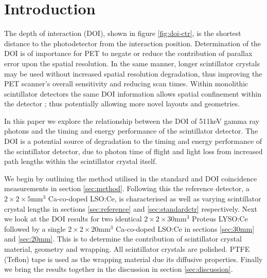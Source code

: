 \section{Introduction} 
The depth of interaction (DOI), shown in figure \ref{fig:doi-ctr}, is the shortest distance to the photodetector from the interaction position. Determination of the DOI is of importance for PET to negate or reduce the contribution of parallax error upon the spatial resolution\cite{Moses_2001}\cite{Humm_Rosenfeld_Del_Guerra_2003}. In the same manner, longer scintillator crystals may be used without increased spatial resolution degradation, thus improving the PET scanner's overall sensitivity and reducing scan times. Within monolithic scintillator detectors the same DOI information allows spatial confinement within the detector \cite{am_Borghi_Seifert_Schaart_2013}\cite{Maas_Bruyndonckx_Schaart_2012}; thus potentially allowing more novel\cite{Dendooven_Lohner_Beekman_2009}\cite{n_der_Lei_van_Dam_Schaart_2013} layouts and geometries.

In this paper we explore the relationship between the DOI of 511keV gamma ray photons and the timing and energy performance of the scintillator detector. The DOI is a potential source of degradation to the timing and energy performance of the scintillator detector, due to photon time of flight and light loss from increased path lengths within the scintillator crystal itself.

We begin by outlining the method utilised in the standard and DOI coincidence measurements in section \ref{sec:method}. Following this the reference detector, a $2\times2\times5$mm$^3$ Ca-co-doped LSO:Ce, is characterised as well as varying scintillator crystal lengths in sections \ref{sec:reference} and \ref{sec:standardctr} respectively. Next we look at the DOI results for two identical $2\times2\times30$mm$^3$ Proteus LYSO:Ce followed by a single $2\times2\times20$mm$^3$ Ca-co-doped LSO:Ce in sections \ref{sec:30mm} and \ref{sec:20mm}. This is to determine the contribution of scintillator crystal material, geometry and wrapping. All scintillator crystals are polished. PTFE (Teflon) tape is used as the wrapping material due its diffusive properties. Finally we bring the results together in the discussion in section \ref{sec:discussion}.
